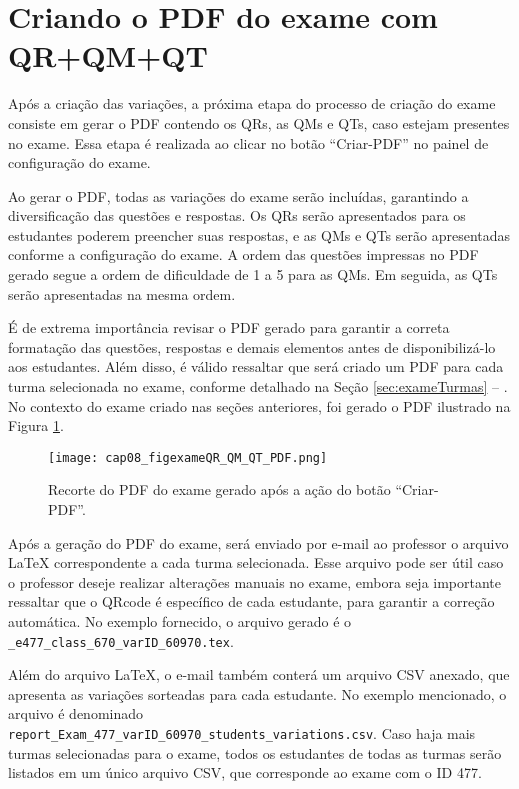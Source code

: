 \section{Criando o PDF do exame com QR+QM+QT}\label{sec:exameQM_QT_criarPDF}

Após a criação das variações, a próxima etapa do processo de criação do exame consiste em gerar o PDF contendo os QRs, as QMs e QTs, caso estejam presentes no exame. Essa etapa é realizada ao clicar no botão ``Criar-PDF'' no painel de configuração do exame.

Ao gerar o PDF, todas as variações do exame serão incluídas, garantindo a diversificação das questões e respostas. Os QRs serão apresentados para os estudantes poderem preencher suas respostas, e as QMs e QTs serão apresentadas conforme a configuração do exame. A ordem das questões impressas no PDF gerado segue a ordem de dificuldade de 1 a 5 para as QMs. Em seguida, as QTs serão apresentadas na mesma ordem.

É de extrema importância revisar o PDF gerado para garantir a correta formatação das questões, respostas e demais elementos antes de disponibilizá-lo aos estudantes.
%
Além disso, é válido ressaltar que será criado um PDF para cada turma selecionada no exame, conforme detalhado na Seção \ref{sec:exameTurmas} -- . No contexto do exame criado nas seções anteriores, foi gerado o PDF ilustrado na Figura \ref{fig:cap08_figexameQR_QM_QT_PDF}. 

\begin{figure}[!ht]
  \centering
  \texttt{[image: cap08\_figexameQR\_QM\_QT\_PDF.png]}
   \caption{Recorte do PDF do exame gerado após a ação do botão ``Criar-PDF''.}
\label{fig:cap08_figexameQR_QM_QT_PDF}
\end{figure}

Após a geração do PDF do exame, será enviado por e-mail ao professor o arquivo \LaTeX{} correspondente a cada turma selecionada. Esse arquivo pode ser útil caso o professor deseje realizar alterações manuais no exame, embora seja importante ressaltar que o QRcode é específico de cada estudante, para garantir a correção automática. No exemplo fornecido, o arquivo gerado é o \verb|_e477_class_670_varID_60970.tex|. 

Além do arquivo \LaTeX{}, o e-mail também conterá um arquivo CSV anexado, que apresenta as variações sorteadas para cada estudante. No exemplo mencionado, o arquivo é denominado \verb|report_Exam_477_varID_60970_students_variations.csv|. Caso haja mais turmas selecionadas para o exame, todos os estudantes de todas as turmas serão listados em um único arquivo CSV, que corresponde ao exame com o ID 477.

